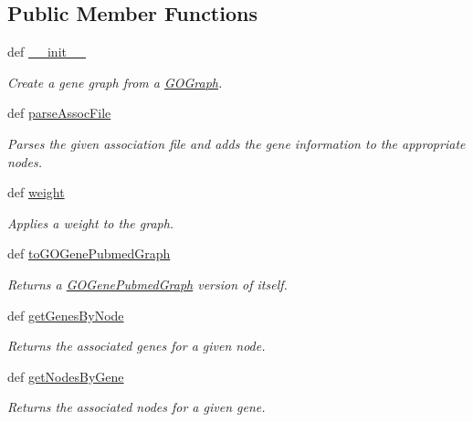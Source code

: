 \subsection*{Public Member Functions}
\begin{DoxyCompactItemize}
\item 
def \hyperlink{class_g_o_gene_graph_1_1_g_o_gene_graph_a37f579f2fd7c2e8f0e52345e5c94233f}{\_\-\_\-init\_\-\_\-}
\begin{DoxyCompactList}\small\item\em Create a gene graph from a \hyperlink{namespace_g_o_graph}{GOGraph}. \item\end{DoxyCompactList}\item 
def \hyperlink{class_g_o_gene_graph_1_1_g_o_gene_graph_a0881964964972853c93e7606b73bb825}{parseAssocFile}
\begin{DoxyCompactList}\small\item\em Parses the given association file and adds the gene information to the appropriate nodes. \item\end{DoxyCompactList}\item 
def \hyperlink{class_g_o_gene_graph_1_1_g_o_gene_graph_a276c7e223374b8c22417e195afacffed}{weight}
\begin{DoxyCompactList}\small\item\em Applies a weight to the graph. \item\end{DoxyCompactList}\item 
def \hyperlink{class_g_o_gene_graph_1_1_g_o_gene_graph_a5f437c2ab06eacde21831786192c4a4e}{toGOGenePubmedGraph}
\begin{DoxyCompactList}\small\item\em Returns a \hyperlink{namespace_g_o_gene_pubmed_graph}{GOGenePubmedGraph} version of itself. \item\end{DoxyCompactList}\item 
def \hyperlink{class_g_o_gene_graph_1_1_g_o_gene_graph_a778128e77640d18bcaf775c2348013d4}{getGenesByNode}
\begin{DoxyCompactList}\small\item\em Returns the associated genes for a given node. \item\end{DoxyCompactList}\item 
def \hyperlink{class_g_o_gene_graph_1_1_g_o_gene_graph_a353497bb1605cfbefba350861e81ea6e}{getNodesByGene}
\begin{DoxyCompactList}\small\item\em Returns the associated nodes for a given gene. \item\end{DoxyCompactList}\end{DoxyCompactItemize}
